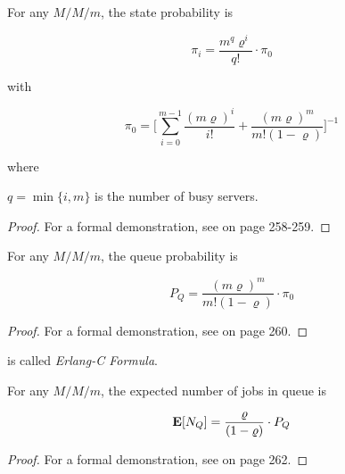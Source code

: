\begin{theorem}
\label{thm:M-M-m-Probability-State}	
	For any $M/M/m$, the state probability is
	
	\begin{equation}
	\label{eqn:M-M-m-Probability-State}
	\pi_{i} = \frac{m^{q} \varrho^{i}}{q!} \cdot \pi_{0}
	\end{equation}
	
	with
	
	\begin{equation}
	\label{eqn:M-M-m-Probability-State-Zero}	
	\pi_{0} = \Big[ \sum_{i=0}^{m-1} \frac{(m \varrho)^{i}}{i!} + \frac{(m \varrho)^{m}}{m! (1- \varrho)} \Big]^{-1}
	\end{equation}
	
	where
	
	$q=\min\{i,m\}$ is the number of busy servers.
	
	\begin{proof}
		For a formal demonstration, see \cite{harchol2013performance} on page 258-259.
	\end{proof}
\end{theorem}

\begin{theorem}
	\label{thm:M-M-m-Probability-Queue}	
	For any $M/M/m$, the queue probability is
	
	\begin{equation}
	\label{eqn:M-M-m-Probability-Queue}
	P_{Q} = \frac{(m \varrho)^{m}}{m!(1-\varrho)} \cdot \pi_{0}
	\end{equation}
	
	\begin{proof}
		For a formal demonstration, see \cite{harchol2013performance} on page 260.
	\end{proof}
\end{theorem}

 is called \textit{Erlang-C Formula}.

\begin{theorem}
	\label{thm:M-M-m-Mean-Queue-Jobs}	
	For any $M/M/m$, the expected number of jobs in queue is
	
	\begin{equation}
	\label{eqn:M-M-m-Mean-Queue-Jobs}
	\expected{N_{Q}} = \frac{\varrho}{(1-\varrho)} \cdot P_{Q}
	\end{equation}
	
	\begin{proof}
		For a formal demonstration, see \cite{harchol2013performance} on page 262.
	\end{proof}
\end{theorem}

